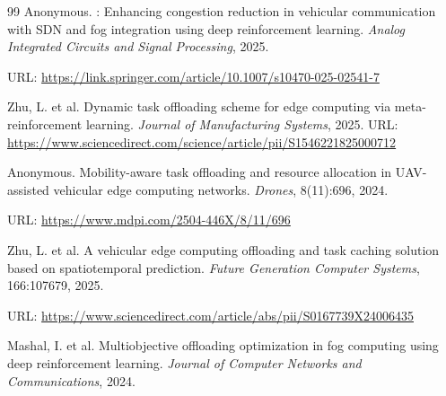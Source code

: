 \documentclass[12pt,a4paper]{article}
\begin{document}
\begin{thebibliography}{99}
{Anonymous}.
: Enhancing congestion reduction in vehicular communication
  with {SDN} and fog integration using deep reinforcement learning.
\newblock \emph{Analog Integrated Circuits and Signal Processing}, 2025.

\newblock URL: \url{https://link.springer.com/article/10.1007/s10470-025-02541-7}

Zhu, L. et al.
\newblock Dynamic task offloading scheme for edge computing via
  meta-reinforcement learning.
\newblock \emph{Journal of Manufacturing Systems}, 2025.
\newblock URL: \url{https://www.sciencedirect.com/science/article/pii/S1546221825000712}

{Anonymous}.
\newblock Mobility-aware task offloading and resource allocation in
  {UAV}-assisted vehicular edge computing networks.
\newblock \emph{Drones}, 8(11):696, 2024.

\newblock URL: \url{https://www.mdpi.com/2504-446X/8/11/696}

Zhu, L. et al.
\newblock A vehicular edge computing offloading and task caching solution based
  on spatiotemporal prediction.
\newblock \emph{Future Generation Computer Systems}, 166:107679, 2025.

\newblock URL: \url{https://www.sciencedirect.com/article/abs/pii/S0167739X24006435}


Mashal, I. et al.
\newblock Multiobjective offloading optimization in fog computing using deep
  reinforcement learning.
\newblock \emph{Journal of Computer Networks and Communications}, 2024.




\end{thebibliography}
\end{document}
